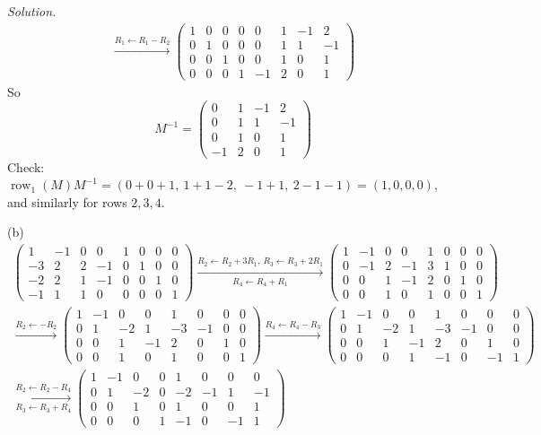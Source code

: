 \documentclass[12pt]{article}
\DeclareMathOperator{\row}{row}
\theoremstyle{definition}
\newenvironment{solution}{\par\noindent\textit{Solution.}\ }{\par\smallskip}
\begin{document}
\begin{solution}
\[\begin{gathered}
\xrightarrow{R_1\leftarrow R_1-R_2}
\left(\begin{array}{cccc|cccc}1&0&0&0&0&1&-1&2\\0&1&0&0&0&1&1&-1\\0&0&1&0&0&1&0&1\\0&0&0&1&-1&2&0&1\end{array}\right)
\end{gathered}
\]
So
\[
M^{-1}=\begin{pmatrix}0&1&-1&2\\0&1&1&-1\\0&1&0&1\\-1&2&0&1\end{pmatrix}
\]
Check: \(\row_1(M)M^{-1}=(0+0+1,\ 1+1-2,\ -1+1,\ 2-1-1)=(1,0,0,0)\), and similarly for rows \(2,3,4\).

(b)
\[
\begin{gathered}
\left(\begin{array}{cccc|cccc}1&-1&0&0&1&0&0&0\\-3&2&2&-1&0&1&0&0\\-2&2&1&-1&0&0&1&0\\-1&1&1&0&0&0&0&1\end{array}\right)
\xrightarrow[R_4\leftarrow R_4+R_1]{R_2\leftarrow R_2+3R_1,\ R_3\leftarrow R_3+2R_1}
\left(\begin{array}{cccc|cccc}1&-1&0&0&1&0&0&0\\0&-1&2&-1&3&1&0&0\\0&0&1&-1&2&0&1&0\\0&0&1&0&1&0&0&1\end{array}\right)
\\
\xrightarrow{R_2\leftarrow-R_2}
\left(\begin{array}{cccc|cccc}1&-1&0&0&1&0&0&0\\0&1&-2&1&-3&-1&0&0\\0&0&1&-1&2&0&1&0\\0&0&1&0&1&0&0&1\end{array}\right)
\xrightarrow{R_4\leftarrow R_4-R_3}
\left(\begin{array}{cccc|cccc}1&-1&0&0&1&0&0&0\\0&1&-2&1&-3&-1&0&0\\0&0&1&-1&2&0&1&0\\0&0&0&1&-1&0&-1&1\end{array}\right)
\\
\xrightarrow[R_3\leftarrow R_3+R_4]{R_2\leftarrow R_2-R_4}
\left(\begin{array}{cccc|cccc}1&-1&0&0&1&0&0&0\\0&1&-2&0&-2&-1&1&-1\\0&0&1&0&1&0&0&1\\0&0&0&1&-1&0&-1&1\end{array}\right)

\end{gathered}\]
\end{solution}
\end{document}
